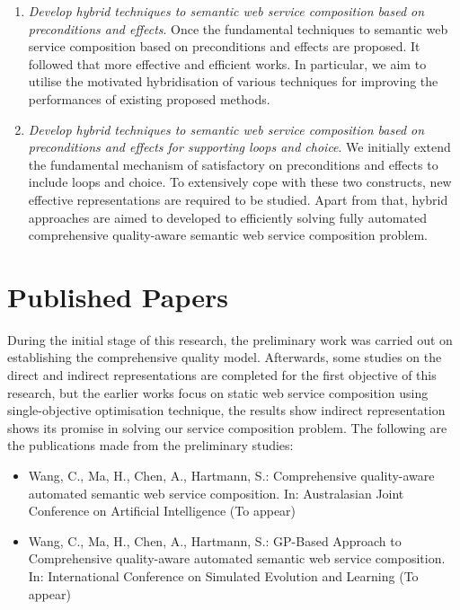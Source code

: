 \begin{enumerate}
\begin{enumerate}
  \item \emph{Develop hybrid techniques to semantic web service composition based on preconditions and effects}. Once the fundamental techniques to semantic web service composition based on preconditions and effects are proposed. It followed that more effective and efficient works. In particular, we aim to utilise the motivated hybridisation of various techniques for improving the performances of existing proposed methods.
    
   \item \emph{Develop hybrid techniques to semantic web service composition based on preconditions and effects for supporting loops and choice}. We initially extend the fundamental mechanism of satisfactory on preconditions and effects to include loops and choice. To extensively cope with these two constructs, new effective representations are required to be studied. Apart from that,  hybrid approaches are aimed to developed to efficiently solving fully automated comprehensive quality-aware semantic web service composition problem.

 
 \end{enumerate}
 
\end{enumerate}

\section{Published Papers}

During the initial stage of this research, the preliminary work was carried out on establishing the comprehensive quality model.  Afterwards, some studies on the direct and indirect representations are completed for the first objective of this research, but the earlier works focus on static web service composition using single-objective optimisation technique, the results show indirect representation shows its promise in solving our service composition problem.  The following are the publications made from the preliminary studies:

\begin{itemize}
 \item Wang, C., Ma, H., Chen, A., Hartmann, S.: Comprehensive quality-aware automated semantic web service composition. In: Australasian Joint Conference on Artificial Intelligence (To appear)
 \item Wang, C., Ma, H., Chen, A., Hartmann, S.: GP-Based Approach to Comprehensive quality-aware automated semantic web service composition. In: International Conference on Simulated Evolution and Learning (To appear)
\end{itemize}


